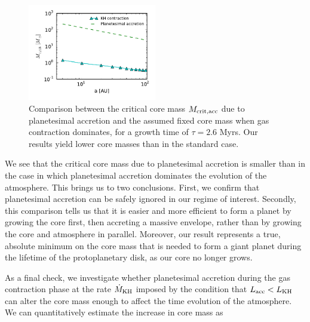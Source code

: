 \documentclass[apj]{emulateapj}
\begin{document}
 \begin{figure}[h]
\centering
\includegraphics[width=0.5\textwidth]{../../figs/ModelAtmospheres/RadSelfGravRealEOS/PaperFigs/Mc_vs_a_poly_raf2_paper.pdf}
\caption{Comparison between the critical core mass $M_{\rm{crit, acc}}$ due to planetesimal accretion and the assumed fixed core mass when gas contraction dominates, for a growth time of $\tau=2.6$ Myrs. Our results yield lower core masses than in the standard case.}
\label{fig:raf2}
\end{figure}

We see that the critical core mass due to planetesimal accretion is smaller than in the case in which planetesimal accretion dominates the evolution of the atmosphere. This brings us to two conclusions. First, we confirm that planetesimal accretion can be safely ignored in our regime of interest. Secondly, this comparison tells us that it is easier and more efficient to form a planet by growing the core first, then accreting a massive envelope, rather than by growing the core and atmosphere in parallel. Moreover, our result represents a true, absolute minimum on the core mass that is needed to form a giant planet during the lifetime of the protoplanetary disk, as our core no longer grows.



As a final check, we investigate whether planetesimal accretion during the gas contraction phase at the rate $\dot{M}_{\rm{KH}}$ imposed by the condition that $L_{\rm{acc}}<L_{\rm{KH}}$ can alter the core mass enough to affect the time evolution of the atmosphere. We can quantitatively estimate the increase in core mass as 
\end{document}
